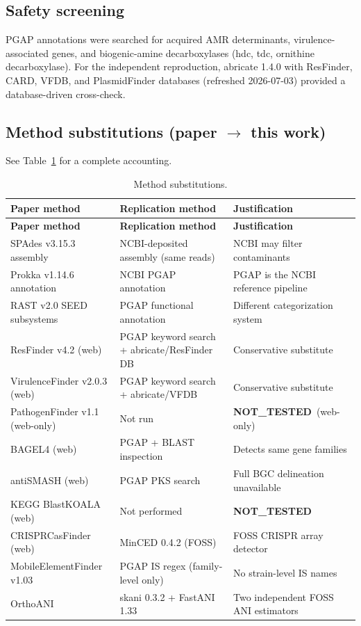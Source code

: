\documentclass[11pt,letterpaper]{article}
\newcommand{\nottested}{\textcolor{gray!70!black}{\textbf{NOT\_TESTED}}}
\begin{document}
\subsection{Safety screening}
PGAP annotations were searched for acquired AMR determinants,
virulence-associated genes, and biogenic-amine decarboxylases
(hdc, tdc, ornithine decarboxylase). For the independent reproduction,
abricate 1.4.0 with ResFinder, CARD, VFDB, and PlasmidFinder databases
(refreshed 2026-07-03) provided a database-driven cross-check.

\subsection{Method substitutions (paper $\rightarrow$ this work)}
See Table~\ref{tab:substitutions} for a complete accounting.

\begin{longtable}{p{4.4cm} p{5.4cm} p{4.4cm}}
\caption{Method substitutions.}
\label{tab:substitutions}\\
\toprule
\textbf{Paper method} & \textbf{Replication method} & \textbf{Justification} \\
\midrule
\endfirsthead
\toprule
\textbf{Paper method} & \textbf{Replication method} & \textbf{Justification} \\
\midrule
\endhead
SPAdes v3.15.3 assembly & NCBI-deposited assembly (same reads) & NCBI may filter contaminants \\
Prokka v1.14.6 annotation & NCBI PGAP annotation & PGAP is the NCBI reference pipeline \\
RAST v2.0 SEED subsystems & PGAP functional annotation & Different categorization system \\
ResFinder v4.2 (web) & PGAP keyword search + abricate/ResFinder DB & Conservative substitute \\
VirulenceFinder v2.0.3 (web) & PGAP keyword search + abricate/VFDB & Conservative substitute \\
PathogenFinder v1.1 (web-only) & Not run & \nottested\ (web-only) \\
BAGEL4 (web) & PGAP + BLAST inspection & Detects same gene families \\
antiSMASH (web) & PGAP PKS search & Full BGC delineation unavailable \\
KEGG BlastKOALA (web) & Not performed & \nottested \\
CRISPRCasFinder (web) & MinCED 0.4.2 (FOSS) & FOSS CRISPR array detector \\
MobileElementFinder v1.03 & PGAP IS regex (family-level only) & No strain-level IS names \\
OrthoANI & skani 0.3.2 + FastANI 1.33 & Two independent FOSS ANI estimators \\
\bottomrule
\end{longtable}
\end{document}
